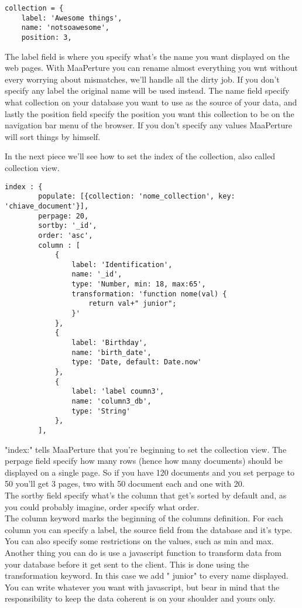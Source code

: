 \begin{lstlisting}
collection = {
	label: 'Awesome things',
	name: 'notsoawesome',
	position: 3,
\end{lstlisting}

The label field is where you specify what's the name you want displayed on the web pages.
With MaaPerture you can rename almost everything you wnt without every worrying about mismatches, we'll handle all the dirty job.
If you don't specify any label the original name will be used instead.
The name field specify what collection on your database you want to use as the source of your data, and lastly the position field specify the position you want this collection to be on the navigation bar menu of the browser.
If you don't specify any values MaaPerture will sort things by himself.

In the next piece we'll see how to set the index of the collection, also called collection view.

\begin{lstlisting}
index : {
		populate: [{collection: 'nome_collection', key: 'chiave_document'}],
		perpage: 20,
		sortby: '_id',
		order: 'asc',
		column : [
			{
				label: 'Identification',
				name: '_id',
				type: 'Number, min: 18, max:65',
				transformation: 'function nome(val) { 	
					return val+" junior";				
				}'
			},
			{	
				label: 'Birthday',
				name: 'birth_date',
				type: 'Date, default: Date.now'
			},
			{	
				label: 'label coumn3',
				name: 'column3_db',
				type: 'String'
			},
		],
\end{lstlisting}

"index:" tells MaaPerture that you're beginning to set the collection view.
The perpage field specify how many rows (hence how many documents) should be displayed on a single page. So if you have 120 documents and you set perpage to 50 you'll get 3 pages, two with 50 document each and one with 20.\\
The sortby field specify what's the column that get's sorted by default and, as you could probably imagine, order specify what order.\\

The column keyword marks the beginning of the columns definition.
For each column you can specify a label, the source field from the database and it's type.
You can also specify some restrictions on the values, such as min and max.\\

Another thing you can do is use a javascript function to transform data from your database before it get sent to the client.
This is done using the transformation keyword. In this case we add " junior" to every name displayed.
You can write whatever you want with javascript, but bear in mind that the responsibility to keep the data coherent is on your shoulder and yours only.


